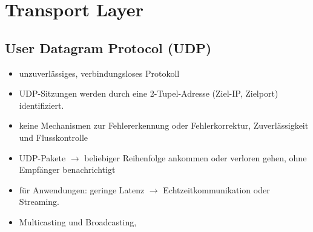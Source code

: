 
\section{Transport Layer}


\subsection{User Datagram Protocol (UDP)}
{
    \begin{itemize}[noitemsep]
        \item unzuverlässiges, verbindungsloses Protokoll
        \item UDP-Sitzungen werden durch eine 2-Tupel-Adresse (Ziel-IP, Zielport) identifiziert.
        \item  keine Mechanismen zur Fehlererkennung oder Fehlerkorrektur, Zuverlässigkeit und Flusskontrolle
        \item UDP-Pakete $\to$ beliebiger Reihenfolge ankommen oder verloren gehen, ohne  Empfänger benachrichtigt
        \item für Anwendungen:  geringe Latenz $\to$ Echtzeitkommunikation oder Streaming.
        \item Multicasting und Broadcasting, 
    \end{itemize}

}
 

